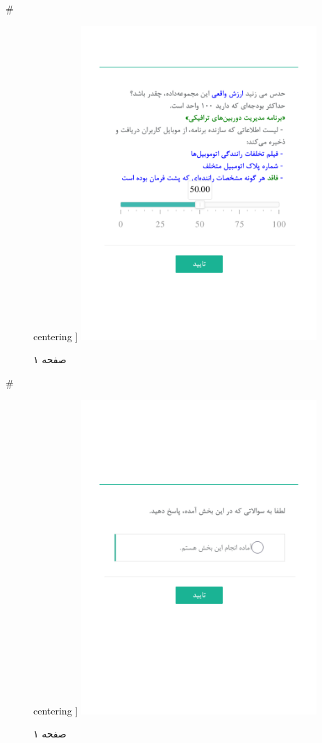 { 
 # 
\begin{figure}[htpb]
centering ]
\includegraphics[width=0.8\textwidth]{./img/Task69.png/}
\caption{صفحه ۱}
\label{fig:Task1}
\end{figure}
 
 
 # 
\begin{figure}[htpb]
centering ]
\includegraphics[width=0.8\textwidth]{./img/Task6.png/}
\caption{صفحه ۱}
\label{fig:Task1}
\end{figure}
 
}
